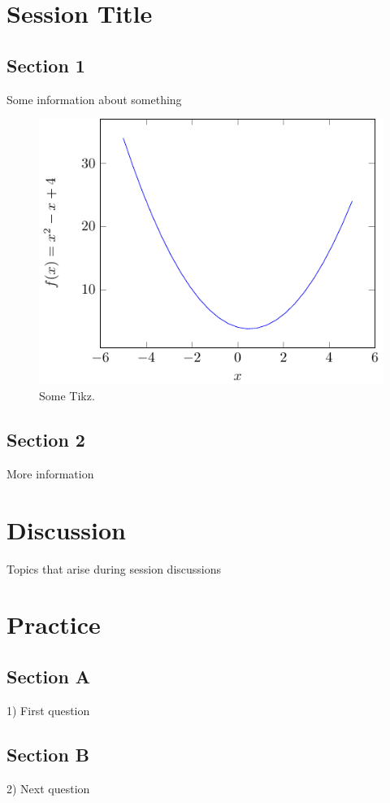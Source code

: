


\maketitle
\clearpage

\section{Session Title}

\subsection{Section 1}

Some information about something \cite{feller1968}

\begin{figure}[h!]
\centering
\includegraphics[width=0.5\linewidth]{tikz/figure1}
\caption{Some Tikz.}
\label{fig:tikz}
\end{figure}

\subsection{Section 2}

More information

\section{Discussion}

Topics that arise during session discussions

\section{Practice}

\subsection{Section A}

1) First question

\subsection{Section B}

2) Next question

\newpage





